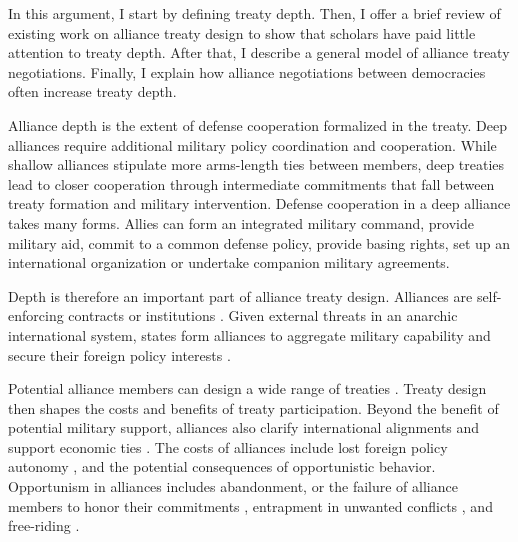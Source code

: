 \documentclass[12pt]{article}
\begin{document}
In this argument, I start by defining treaty depth. 
Then, I offer a brief review of existing work on alliance treaty design to show that scholars have paid little attention to treaty depth.  
After that, I describe a general model of alliance treaty negotiations. 
Finally, I explain how alliance negotiations between democracies often increase treaty depth. 


Alliance depth is the extent of defense cooperation formalized in the treaty. 
Deep alliances require additional military policy coordination and cooperation. 
While shallow alliances stipulate more arms-length ties between members, deep treaties lead to closer cooperation through intermediate commitments that fall between treaty formation and military intervention. 
Defense cooperation in a deep alliance takes many forms. 
Allies can form an integrated military command, provide military aid, commit to a common defense policy, provide basing rights, set up an international organization or undertake companion military agreements. 


Depth is therefore an important part of alliance treaty design.
Alliances are self-enforcing contracts or institutions \citep{Leedsetal2002, Morrow2000}.
Given external threats in an anarchic international system, states form alliances to aggregate military capability and secure their foreign policy interests \citep{Altfield1984, Smith1995, Snyder1997, FordhamPoast2014}. 


Potential alliance members can design a wide range of treaties \citep{Leedsetal2000, Leedsetal2002, Benson2012, BensonClinton2016}. 
Treaty design then shapes the costs and benefits of treaty participation. 
Beyond the benefit of potential military support, alliances also clarify international alignments \citep{Snyder1990} and support economic ties \citep{Gowa1995, Li2003, Long2003, Fordham2010, WolfordKim2017}. 
The costs of alliances include lost foreign policy autonomy \citep{Altfield1984, Morrow2000, Johnson2015}, and the potential consequences of opportunistic behavior. 
Opportunism in alliances includes abandonment, or the failure of alliance members to honor their commitments \citep{Leeds2003a, BerkemeierFuhrmann2018}, entrapment in unwanted conflicts \citep{Snyder1984}, and free-riding \citep{Morrow2000}.   
\end{document}
